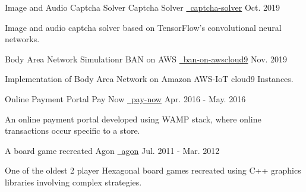 \begin{cventries}
   \cventry
    {Image and Audio Captcha Solver}
    {Captcha Solver}
    {\href{https://github.com/mukeshmk/image-audio-captcha}{\faGithubSquare\ captcha-solver}}
    {Oct. 2019}
    {
      \begin{cvitems}
        \item {Image and audio captcha solver based on TensorFlow’s convolutional neural networks.}
      \end{cvitems}
    }
  \cventry
    {Body Area Network Simulationr}
    {BAN on AWS}
    {\href{https://github.com/mukeshmk/ban-on-awscloud9}{\faGithubSquare\ ban-on-awscloud9}}
    {Nov. 2019}
    {
      \begin{cvitems}
        \item {Implementation of Body Area Network on Amazon AWS-IoT cloud9 Instances.}
      \end{cvitems}
    }
  \cventry
    {Online Payment Portal}
    {Pay Now}
    {\href{https://github.com/mukeshmk/pay-now}{\faGithubSquare\ pay-now}}
    {Apr. 2016 - May. 2016}
    {
      \begin{cvitems}
        \item {An online payment portal developed using WAMP stack, where online transactions occur specific to a store.}
      \end{cvitems}
    }
  \cventry
    {A board game recreated}
    {Agon}
    {\href{https://github.com/mukeshmk/agon}{\faGithubSquare\ agon}}
    {Jul. 2011 - Mar. 2012}
    {
      \begin{cvitems}
        \item {One of the oldest 2 player Hexagonal board games recreated using C++ graphics libraries involving complex strategies.}
      \end{cvitems}
    }
\end{cventries}

